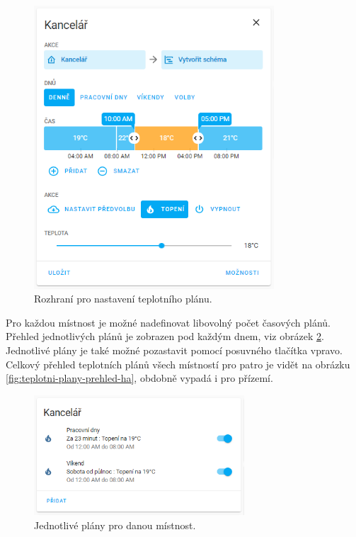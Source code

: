 \begin{figure}[H]
    \centering
    \includegraphics[width=0.8\textwidth]{images/software-ha/teplotni-plan-ha.png}
    \caption{Rozhraní pro nastavení teplotního plánu.}
    \label{fig:teplotni-plan-ha}
\end{figure}

Pro každou místnost je možné nadefinovat libovolný počet časových plánů. Přehled jednotlivých plánů je zobrazen pod každým dnem, viz obrázek \ref{fig:teplotni-plany-ha}. Jednotlivé plány je také možné pozastavit pomocí posuvného tlačítka vpravo. Celkový přehled teplotních plánů všech místností pro patro je vidět na obrázku \ref{fig:teplotni-plany-prehled-ha}, obdobně vypadá i pro přízemí.

\begin{figure}[H]
    \centering
    \includegraphics[width=0.7\textwidth]{images/software-ha/teplotni-plany-ha.png}
    \caption{Jednotlivé plány pro danou místnost.}
    \label{fig:teplotni-plany-ha}
\end{figure}


